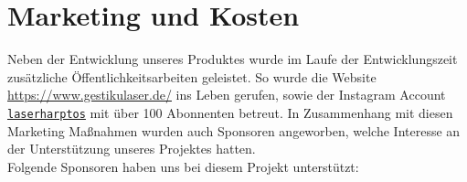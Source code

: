 \chapter{Marketing und Kosten}
\label{ch:Kosten}

Neben der Entwicklung unseres Produktes wurde im Laufe der Entwicklungszeit zusätzliche Öffentlichkeitsarbeiten geleistet. So wurde die Website \url{https://www.gestikulaser.de/} ins Leben gerufen, sowie der Instagram Account \href{https://www.instagram.com/laserharptos/}{\texttt{laserharptos}} mit über 100 Abonnenten betreut. In Zusammenhang mit diesen Marketing Maßnahmen wurden auch Sponsoren angeworben, welche Interesse an der Unterstützung unseres Projektes hatten. \\
Folgende Sponsoren haben uns bei diesem Projekt unterstützt: \\

